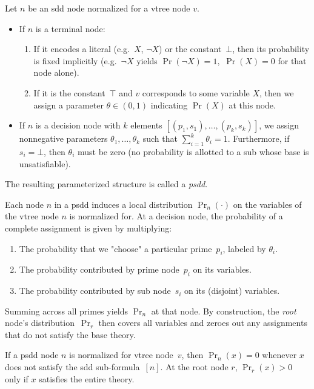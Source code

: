 \begin{definition}
\label{def:psdd-syntax}
Let $n$ be an \acrshort{sdd} node normalized for a vtree node $v$.
\begin{itemize}
\item If $n$ is a terminal node:
\begin{enumerate}
\item If it encodes a literal (e.g.\ $X$, $\neg X$) or the constant~$\bot$, then its probability is fixed implicitly (e.g.\ $\neg X$ yields $\Pr(\neg X)=1,$ $\Pr(X)=0$ for that node alone).
\item If it is the constant~$\top$ and $v$ corresponds to some variable $X$, then we assign a parameter $\theta\in(0,1)$ indicating $\Pr(X)$ at this node.
\end{enumerate}
\item If $n$ is a decision node with $k$ elements $[(p_1,s_1), \ldots, (p_k,s_k)]$, we assign nonnegative parameters $\theta_1,\ldots,\theta_k$ such that $\sum_{i=1}^k \theta_i=1$.  Furthermore, if $s_i = \bot$, then $\theta_i$ must be zero (no probability is allotted to a sub whose base is unsatisfiable).
\end{itemize}
The resulting parameterized structure is called a \emph{\acrshort{psdd}}.
\end{definition}

Each node $n$ in a \acrshort{psdd} induces a local distribution $\Pr_n(\cdot)$ on the variables of the vtree node $n$ is normalized for.  At a decision node, the probability of a complete assignment is given by multiplying:
\begin{enumerate}
\item The probability that we "choose" a particular prime~$p_i$, labeled by $\theta_i$.
\item The probability contributed by prime node~$p_i$ on its variables.
\item The probability contributed by sub node~$s_i$ on its (disjoint) variables.
\end{enumerate}
Summing across all primes yields $\Pr_n$ at that node.  By construction, the \emph{root} node's distribution~$\Pr_r$ then covers all variables and zeroes out any assignments that do not satisfy the base theory.

\begin{theorem}
\label{thm:psdd-base}
If a \acrshort{psdd} node $n$ is normalized for vtree node~$v$, then $\Pr_n(x)=0$ whenever $x$ does not satisfy the \acrshort{sdd} sub-formula~$[n]$.  At the root node $r$, $\Pr_r(x)>0$ only if $x$ satisfies the entire theory.
\end{theorem}

